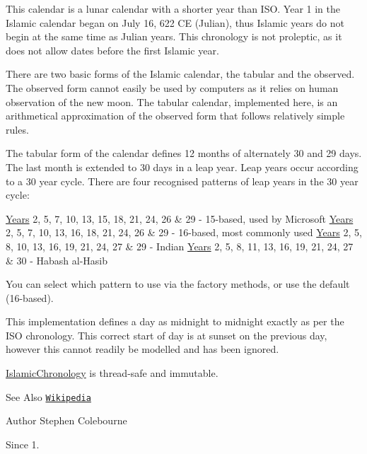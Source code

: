This calendar is a lunar calendar with a shorter year than I\-S\-O. Year 1 in the Islamic calendar began on July 16, 622 C\-E (Julian), thus Islamic years do not begin at the same time as Julian years. This chronology is not proleptic, as it does not allow dates before the first Islamic year. 

There are two basic forms of the Islamic calendar, the tabular and the observed. The observed form cannot easily be used by computers as it relies on human observation of the new moon. The tabular calendar, implemented here, is an arithmetical approximation of the observed form that follows relatively simple rules. 

The tabular form of the calendar defines 12 months of alternately 30 and 29 days. The last month is extended to 30 days in a leap year. Leap years occur according to a 30 year cycle. There are four recognised patterns of leap years in the 30 year cycle\-: 
\begin{DoxyPre}
\hyperlink{classorg_1_1joda_1_1time_1_1_years}{Years} 2, 5, 7, 10, 13, 15, 18, 21, 24, 26 \& 29 - 15-based, used by Microsoft
\hyperlink{classorg_1_1joda_1_1time_1_1_years}{Years} 2, 5, 7, 10, 13, 16, 18, 21, 24, 26 \& 29 - 16-based, most commonly used
\hyperlink{classorg_1_1joda_1_1time_1_1_years}{Years} 2, 5, 8, 10, 13, 16, 19, 21, 24, 27 \& 29 - Indian
\hyperlink{classorg_1_1joda_1_1time_1_1_years}{Years} 2, 5, 8, 11, 13, 16, 19, 21, 24, 27 \& 30 - Habash al-Hasib
\end{DoxyPre}
 You can select which pattern to use via the factory methods, or use the default (16-\/based). 

This implementation defines a day as midnight to midnight exactly as per the I\-S\-O chronology. This correct start of day is at sunset on the previous day, however this cannot readily be modelled and has been ignored. 

\hyperlink{classorg_1_1joda_1_1time_1_1chrono_1_1_islamic_chronology}{Islamic\-Chronology} is thread-\/safe and immutable.

\begin{DoxySeeAlso}{See Also}
\href{http://en.wikipedia.org/wiki/Islamic_calendar}{\tt Wikipedia}
\end{DoxySeeAlso}
\begin{DoxyAuthor}{Author}
Stephen Colebourne 
\end{DoxyAuthor}
\begin{DoxySince}{Since}
1. 
\end{DoxySince}


